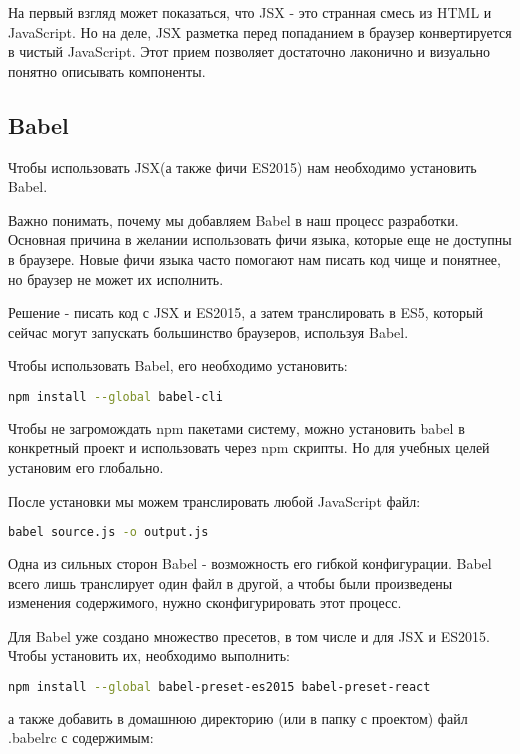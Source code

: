 \documentclass[12pt]{book}
\begin{document}
На первый взгляд может показаться, что JSX - это странная смесь из HTML и JavaScript. Но на деле, JSX разметка перед попаданием в браузер конвертируется в чистый JavaScript. Этот прием позволяет достаточно лаконично и визуально понятно описывать компоненты.

\subsection*{Babel}

Чтобы использовать JSX(а также фичи ES2015) нам необходимо установить Babel. 

Важно понимать, почему мы добавляем Babel в наш процесс разработки. Основная причина в желании использовать фичи языка, которые еще не доступны в браузере. Новые фичи языка часто помогают нам писать код чище и понятнее, но браузер не может их исполнить.

Решение - писать код с JSX и ES2015, а затем транслировать в ES5, который сейчас могут запускать большинство браузеров, используя Babel.

Чтобы использовать Babel, его необходимо установить:

\begin{lstlisting}[language=bash]
	npm install --global babel-cli
\end{lstlisting}

Чтобы не загромождать npm пакетами систему, можно установить babel в конкретный проект и использовать через npm скрипты. Но для учебных целей установим его глобально.

После установки мы можем транслировать любой JavaScript файл:

\begin{lstlisting}[language=bash]
	babel source.js -o output.js
\end{lstlisting}

Одна из сильных сторон Babel - возможность его гибкой конфигурации. Babel всего лишь транслирует один файл в другой, а чтобы были произведены изменения содержимого, нужно сконфигурировать этот процесс.

Для Babel уже создано множество пресетов, в том числе и для JSX и ES2015. Чтобы установить их, необходимо выполнить:

\begin{lstlisting}[language=bash]
npm install --global babel-preset-es2015 babel-preset-react	
\end{lstlisting}

а также добавить в домашнюю директорию (или в папку с проектом) файл .babelrc с содержимым:
\end{document}
